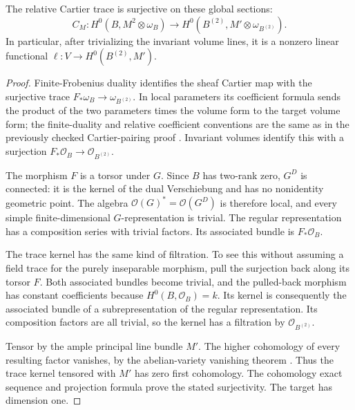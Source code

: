 \begin{lemma}
\label{lem:principal-theta-Cartier-surjective}
The relative Cartier trace is surjective on these global sections:
\[
 C_M:H^0(B,M^2\otimes\omega_B)
       \longrightarrow H^0(B^{(2)},M'\otimes\omega_{B^{(2)}}).
\]
In particular, after trivializing the invariant volume lines, it is a
nonzero linear functional \(\ell:V\to H^0(B^{(2)},M')\).
\end{lemma}
\begin{proof}
Finite-Frobenius duality identifies the sheaf Cartier map with the
surjective trace \(F_*\omega_B\to\omega_{B^{(2)}}\).  In local
parameters its coefficient formula sends the product of the two
parameters times the volume form to the target volume form; the
finite-duality and relative coefficient conventions are the same as in
the previously checked Cartier-pairing proof
\citep[Proposition~1.3.7 and Theorem~1.3.8,
pp.~26--28]{BrionKumar2005}.
Invariant volumes identify this with a surjection
\(F_*\mathcal O_B\to\mathcal O_{B^{(2)}}\).

The morphism \(F\) is a torsor under \(G\).  Since \(B\) has
two-rank zero, \(G^D\) is connected: it is the kernel of the dual
Verschiebung and has no nonidentity geometric point.  The algebra
\(\mathcal O(G)^*=\mathcal O(G^D)\) is therefore local, and every
simple finite-dimensional \(G\)-representation is trivial.  The
regular representation has a composition series with trivial factors.
Its associated bundle is \(F_*\mathcal O_B\).

The trace kernel has the same kind of filtration.  To see this without
assuming a field trace for the purely inseparable morphism, pull the
surjection back along its torsor \(F\).  Both associated bundles become
trivial, and the pulled-back morphism has constant coefficients because
\(H^0(B,\mathcal O_B)=k\).  Its kernel is consequently the associated
bundle of a subrepresentation of the regular representation.  Its
composition factors are all trivial, so the kernel has a filtration by
\(\mathcal O_{B^{(2)}}\).

Tensor by the ample principal line bundle \(M'\).
The higher cohomology of every resulting factor vanishes, by the
abelian-variety vanishing theorem
\citep[Theorem~9.14, p.~133]{EdixhovenVanDerGeerMoonenAV}.
Thus the trace kernel tensored with \(M'\) has zero first cohomology.
The cohomology exact sequence and projection formula prove the stated
surjectivity.  The target has dimension one.
\end{proof}

